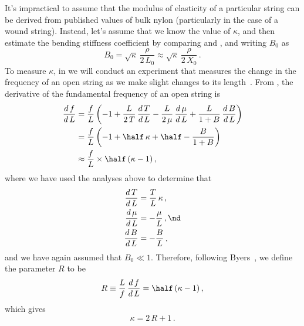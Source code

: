It's impractical to assume that the modulus of elasticity of a particular string can be derived from published values of bulk nylon (particularly in the case of a wound string). Instead, let's assume that we know the value of $\kappa$, and then estimate the bending stiffness coefficient by comparing  and , and writing $B_0$ as
\begin{equation} \label{eqn:b_0_kappa}
  B_0 = \sqrt{\kappa}\, \frac{\rho}{2\, L_0} \approx \sqrt{\kappa}\, \frac{\rho}{2\, X_0}\, .
\end{equation}
To measure $\kappa$, in  we will conduct an experiment that measures the change in the frequency of an open string as we make slight changes to its length~\cite{ref:byers1996cgi,ref:varieschi2010icf}. From , the derivative of the fundamental frequency of an open string is
 \begin{equation}
 \begin{split}
\frac{d\, f}{d\, L} &= \frac{f}{L} \left( -1 + \frac{L}{2\, T}\, \frac{d\, T}{d\, L} - \frac{L}{2\, \mu}\, \frac{d\, \mu}{d\, L} + \frac{L}{1 + B}\, \frac{d\, B}{d\, L} \right) \\
&= \frac{f}{L} \left( -1 + \half\, \kappa + \half - \frac{B}{1 + B} \right) \\
&\approx \frac{f}{L} \times \half\, (\kappa - 1)\, ,
 \end{split}
 \end{equation}
where we have used the analyses above to determine that
 \begin{subequations}
 \begin{align}
\frac{d\, T}{d\, L} &= \frac{T}{L}\, \kappa\, , \\
\frac{d\, \mu}{d\, L} &= -\frac{\mu}{L}\, , \nd \\
\frac{d\, B}{d\, L} &= -\frac{B}{L}\, , \\
 \end{align}
 \end{subequations}
and we have again assumed that $B_0 \ll 1$. Therefore, following Byers~\cite{ref:byers1996cgi,ref:varieschi2010icf}, we define the parameter $R$ to be
 \begin{equation}\label{eqn:r_def}
R \equiv \frac{L}{f}\, \frac{d\, f}{d\, L} = \half\, (\kappa - 1)\, ,
 \end{equation}
which gives
 \begin{equation} \label{eqn:kappa_r}
\kappa = 2\, R + 1\, .
 \end{equation}

